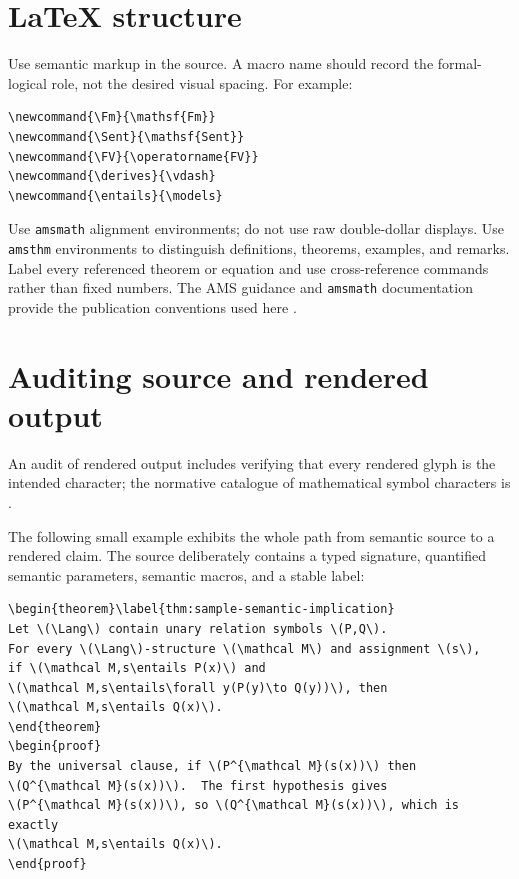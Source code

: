 \documentclass[11pt,oneside,openany]{book}
\theoremstyle{definition}
\theoremstyle{plain}
\newtheorem{theorem}[definition]{Theorem}
\theoremstyle{remark}
\let\LogicTheorem\theorem
\let\endLogicTheorem\endtheorem
\renewenvironment{theorem}[1][]{%
  \LogicTheorem[#1]%
  \if\relax\detokenize{#1}\relax\else\index{#1}\fi
}{\endLogicTheorem}
\newcommand{\Lang}{\mathcal{L}}
\newcommand{\Fm}{\mathsf{Fm}}
\newcommand{\Sent}{\mathsf{Sent}}
\newcommand{\FV}{\operatorname{FV}}
\newcommand{\entails}{\models}
\newcommand{\derives}{\vdash}
\begin{document}
\section{LaTeX structure}
\label{sec:latex-style-03}

Use semantic markup in the source.  A macro name should record the formal-logical
role, not the desired visual spacing.  For example:
\begin{lstlisting}[language={[LaTeX]TeX},caption={Semantic macros for logic}]
\newcommand{\Fm}{\mathsf{Fm}}
\newcommand{\Sent}{\mathsf{Sent}}
\newcommand{\FV}{\operatorname{FV}}
\newcommand{\derives}{\vdash}
\newcommand{\entails}{\models}
\end{lstlisting}

Use \texttt{amsmath} alignment environments; do not use raw double-dollar
displays.  Use \texttt{amsthm} environments to distinguish definitions,
theorems, examples, and remarks.  Label every referenced theorem or equation
and use cross-reference commands rather than fixed numbers.  The AMS guidance
and \texttt{amsmath} documentation provide the publication conventions used
here \cite{AMSAuthorHandbook,AMSMathGuide}.

\section{Auditing source and rendered output}
\label{sec:latex-style-source-render}

An audit of rendered output includes verifying that every rendered glyph is
the intended character; the normative catalogue of mathematical symbol
characters is \cite{Unicode2025}.

The following small example exhibits the whole path from semantic source to a
rendered claim.  The source deliberately contains a typed signature, quantified
semantic parameters, semantic macros, and a stable label:
\begin{lstlisting}[language={[LaTeX]TeX},caption={Source for a semantic implication}]
\begin{theorem}\label{thm:sample-semantic-implication}
Let \(\Lang\) contain unary relation symbols \(P,Q\).
For every \(\Lang\)-structure \(\mathcal M\) and assignment \(s\),
if \(\mathcal M,s\entails P(x)\) and
\(\mathcal M,s\entails\forall y(P(y)\to Q(y))\), then
\(\mathcal M,s\entails Q(x)\).
\end{theorem}
\begin{proof}
By the universal clause, if \(P^{\mathcal M}(s(x))\) then
\(Q^{\mathcal M}(s(x))\).  The first hypothesis gives
\(P^{\mathcal M}(s(x))\), so \(Q^{\mathcal M}(s(x))\), which is exactly
\(\mathcal M,s\entails Q(x)\).
\end{proof}
\end{lstlisting}
\end{document}
